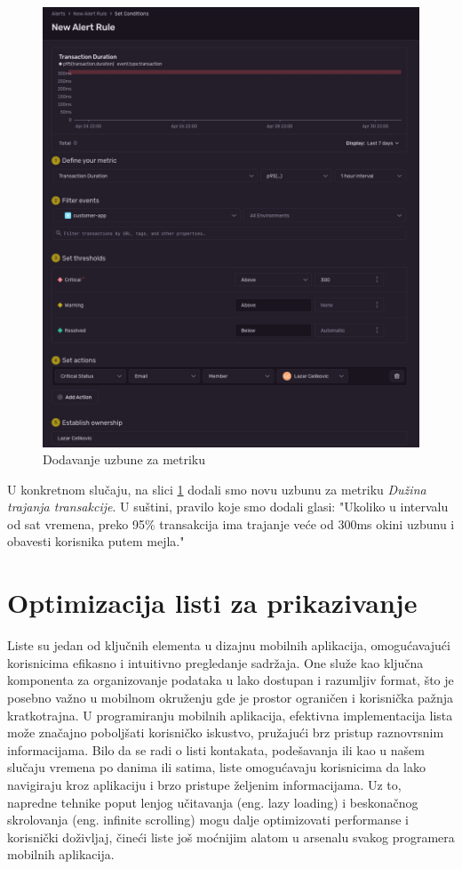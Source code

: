 \documentclass[12pt,oneside]{memoir}
\begin{document}
\begin{figure}
    \centering
    \includegraphics[scale=0.3]{docs/images/chapterFive/addRule.png}
    \caption{Dodavanje uzbune za metriku}
    \label{fig:addRuleForMetric}
\end{figure}

U konkretnom slučaju, na slici \ref{fig:addRuleForMetric} dodali smo novu uzbunu za metriku \textit{Dužina trajanja transakcije}. U suštini, pravilo koje smo dodali glasi: "Ukoliko u intervalu od sat vremena, preko 95\% transakcija ima trajanje veće od 300ms okini uzbunu i obavesti korisnika putem mejla."

\section{Optimizacija listi za prikazivanje}

Liste su jedan od ključnih elementa u dizajnu mobilnih aplikacija, omogućavajući korisnicima efikasno i intuitivno pregledanje sadržaja. One služe kao ključna komponenta za organizovanje podataka u lako dostupan i razumljiv format, što je posebno važno u mobilnom okruženju gde je prostor ograničen i korisnička pažnja kratkotrajna. U programiranju mobilnih aplikacija, efektivna implementacija lista može značajno poboljšati korisničko iskustvo, pružajući brz pristup raznovrsnim informacijama. Bilo da se radi o listi kontakata, podešavanja ili kao u našem slučaju vremena po danima ili satima, liste omogućavaju korisnicima da lako navigiraju kroz aplikaciju i brzo pristupe željenim informacijama. Uz to, napredne tehnike poput lenjog učitavanja (eng. lazy loading) i beskonačnog skrolovanja (eng. infinite scrolling) mogu dalje optimizovati performanse i korisnički doživljaj, čineći liste još moćnijim alatom u arsenalu svakog programera mobilnih aplikacija.
\end{document}
